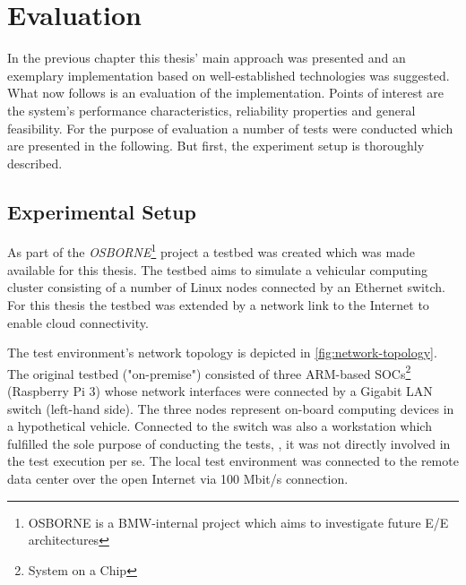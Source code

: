 
\chapter{Evaluation}\label{chapter:evaluation}

In the previous chapter this thesis' main approach was presented and an exemplary implementation based on well-established technologies was suggested. What now follows is an evaluation of the implementation. Points of interest are the system's performance characteristics, reliability properties and general feasibility. For the purpose of evaluation a number of tests were conducted which are presented in the following. But first, the experiment setup is thoroughly described.


\section{Experimental Setup}\label{sec:testsetup}

As part of the \emph{OSBORNE}\footnote{OSBORNE is a BMW-internal project which aims to investigate future E/E architectures} project a testbed was created which was made available for this thesis. The testbed aims to simulate a vehicular computing cluster consisting of a number of Linux nodes connected by an Ethernet switch. For this thesis the testbed was extended by a network link to the Internet to enable cloud connectivity. 

The test environment's network topology is depicted in \autoref{fig:network-topology}. The original testbed ("on-premise") consisted of three ARM-based SOCs\footnote{System on a Chip} (Raspberry Pi 3) whose network interfaces were connected by a Gigabit LAN switch (left-hand side). The three nodes represent on-board computing devices in a hypothetical vehicle. Connected to the switch was also a workstation which fulfilled the sole purpose of conducting the tests, \ie , it was not directly involved in the test execution per se. The local test environment was connected to the remote data center over the open Internet via 100 Mbit/s connection.

